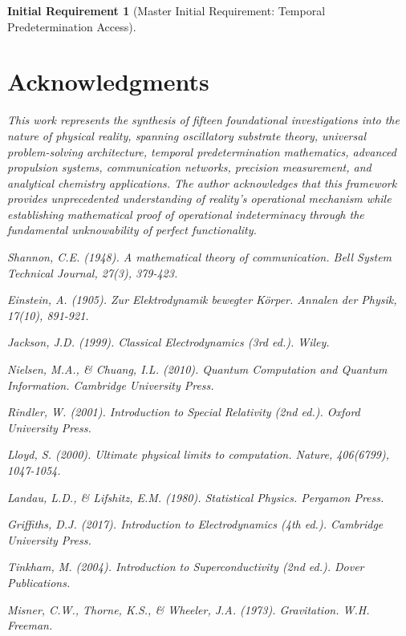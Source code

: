 \documentclass[12pt,a4paper]{article}
\newtheorem{requirement}[theorem]{Initial Requirement}
\theoremstyle{remark}
\begin{document}
\begin{requirement}[Master Initial Requirement: Temporal Predetermination Access]
\section*{Acknowledgments}

This work represents the synthesis of fifteen foundational investigations into the nature of physical reality, spanning oscillatory substrate theory, universal problem-solving architecture, temporal predetermination mathematics, advanced propulsion systems, communication networks, precision measurement, and analytical chemistry applications. The author acknowledges that this framework provides unprecedented understanding of reality's operational mechanism while establishing mathematical proof of operational indeterminacy through the fundamental unknowability of perfect functionality.


\begin{thebibliography}{99}

Shannon, C.E. (1948). A mathematical theory of communication. \textit{Bell System Technical Journal}, 27(3), 379-423.

Einstein, A. (1905). Zur Elektrodynamik bewegter Körper. \textit{Annalen der Physik}, 17(10), 891-921.

Jackson, J.D. (1999). \textit{Classical Electrodynamics} (3rd ed.). Wiley.

Nielsen, M.A., \& Chuang, I.L. (2010). \textit{Quantum Computation and Quantum Information}. Cambridge University Press.

Rindler, W. (2001). \textit{Introduction to Special Relativity} (2nd ed.). Oxford University Press.

Lloyd, S. (2000). Ultimate physical limits to computation. \textit{Nature}, 406(6799), 1047-1054.

Landau, L.D., \& Lifshitz, E.M. (1980). \textit{Statistical Physics}. Pergamon Press.

Griffiths, D.J. (2017). \textit{Introduction to Electrodynamics} (4th ed.). Cambridge University Press.

Tinkham, M. (2004). \textit{Introduction to Superconductivity} (2nd ed.). Dover Publications.

Misner, C.W., Thorne, K.S., \& Wheeler, J.A. (1973). \textit{Gravitation}. W.H. Freeman.


\end{thebibliography}
\end{requirement}
\end{document}
